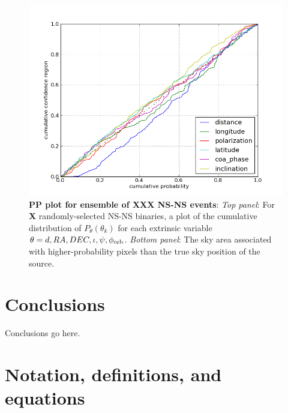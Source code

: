 \documentclass[twocolumn,prd,nofootinbib]{revtex4}
\begin{document}
\begin{figure}
\includegraphics[width=\columnwidth]{../Figures/2015_BNS_MDC_pat_and_chris_pp_plot}
\caption{\label{fig:pp:2015Ensemble}\textbf{PP plot for ensemble of XXX NS-NS events}: \emph{Top panel}: For \textbf{X} randomly-selected NS-NS binaries, a plot of
  the cumulative distribution of $P_\theta(\theta_k)$ for each extrinsic variable $\theta=d,RA,DEC,\iota,\psi,\phi_{\rm
    orb}$.
\emph{Bottom panel}: The sky area associated with higher-probability pixels than the true sky position of the source.
}
\end{figure}


\section{Conclusions}

Conclusions go here.

\appendix


\section{Notation, definitions, and equations}
\end{document}
